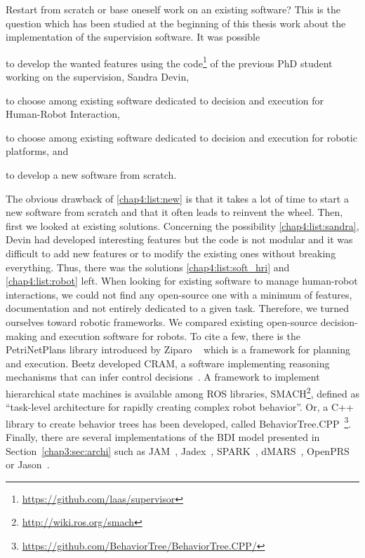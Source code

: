 \documentclass[a4paper,11pt,twoside]{StyleThese}
\begin{document}
Restart from scratch or base oneself work on an existing software? This is the question which has been studied at the beginning of this thesis work about the implementation of the supervision software. It was possible 
\begin{inlineEnumerate}
	\item to develop the wanted features using the code\footnote{\url{https://github.com/laas/supervisor}} of the previous PhD student working on the supervision, Sandra Devin,\label{chap4:list:sandra}
	\item to choose among existing software dedicated to decision and execution for Human-Robot Interaction,\label{chap4:list:soft_hri}
	\item to choose among existing software dedicated to decision and execution for robotic platforms, and\label{chap4:list:robot}
	\item to develop a new software from scratch.\label{chap4:list:new}
\end{inlineEnumerate}

The obvious drawback of \ref{chap4:list:new} is that it takes a lot of time to start a new software from scratch and that it often leads to reinvent the wheel. Then, first we looked at existing solutions. Concerning the possibility \ref{chap4:list:sandra}, Devin had developed interesting features but the code is not modular and it was difficult to add new features or to modify the existing ones without breaking everything. Thus, there was the solutions \ref{chap4:list:soft_hri} and \ref{chap4:list:robot} left. When looking for existing software to manage human-robot interactions, we could not find any open-source one with a minimum of features, documentation and not entirely dedicated to a given task. Therefore, we turned ourselves toward robotic frameworks. We compared existing open-source decision-making and execution software for robots. To cite a few, there is the PetriNetPlans library introduced by Ziparo \etal~\cite{ziparo_2011_petri} which is a framework for planning and execution. Beetz \etal{} developed CRAM, a software implementing reasoning mechanisms that can infer control decisions~\cite{beetz_2010_cram}. A framework to implement hierarchical state machines is available among ROS libraries, SMACH\footnote{\url{http://wiki.ros.org/smach}}, defined as ``task-level architecture for rapidly creating complex robot behavior''. Or, a C++ library to create behavior trees has been developed, called BehaviorTree.CPP~\footnote{\url{https://github.com/BehaviorTree/BehaviorTree.CPP/}}. Finally, there are several implementations of the BDI model presented in Section~\ref{chap3:sec:archi} such as JAM~\cite{huber_1999_jam}, Jadex~\cite{braudach_2005_jadex}, SPARK~\cite{morley_2004_spark}, dMARS~\cite{dinverno_1998_formal}, OpenPRS~\cite{ingrand_1996_prs} or Jason~\cite{bordini_2007_jason}. 
\end{document}
